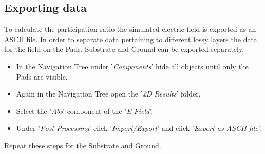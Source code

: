 \subsection{Exporting data}
To calculate the participation ratio the simulated electric field is exported as an ASCII file. In order to separate data pertaining to different lossy layers the data for the field on the Pads, Substrate and Ground can be exported separately. 
\begin{itemize}
	\item In the Navigation Tree under '\textit{Components}' hide all objects until only the Pads are visible.
	\item Again in the Navigation Tree open the '\textit{2D Results}' folder.
	\item Select the '\textit{Abs}' component of the '\textit{E-Field}'.
	\item Under '\textit{Post Processing}' click '\textit{Import/Export}' and click '\textit{Export as ASCII file}'. 
\end{itemize}
Repeat these steps for the Substrate and Ground.